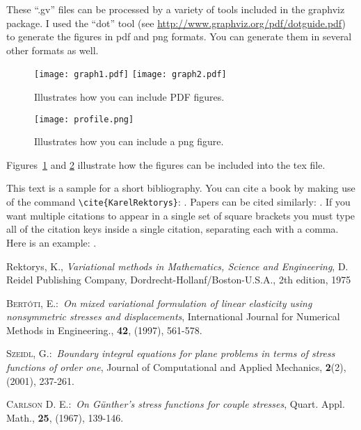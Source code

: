 \documentclass[11pt,a4paper]{amsart}
\theoremstyle{plain}
\numberwithin{equation}{section}
\theoremstyle{definition}
\begin{document}
These ``.gv'' files can be processed by a variety of tools included in the graphviz package. I used the ``dot'' tool (see \url{http://www.graphviz.org/pdf/dotguide.pdf}) to generate the figures in pdf and png formats. You can generate them in several other formats as well.

\begin{figure}[h] \label{fig:pdf}
	\texttt{[image: graph1.pdf]} \hspace{0.5in}
	\texttt{[image: graph2.pdf]}
	\caption{Illustrates how you can include PDF figures.}
	
\end{figure}


\begin{figure}[h] \label{fig:png}
	\texttt{[image: profile.png]} \hspace{0.5in}
	\caption{Illustrates how you can include a png figure.}
	
\end{figure}

Figures~\ref{fig:pdf} and \ref{fig:png} illustrate how the figures can be included into the tex file. 

This text is a sample for a short bibliography. You can cite a book by making use of
the command \verb"\cite{KarelRektorys}": \cite{KarelRektorys}. Papers can be cited
similarly: \cite{Bertoti97}. If you want multiple citations to appear in a single set
of square brackets you must type all of the citation keys inside a single citation,
separating each with a comma. Here is an example: \cite{Bertoti97, Szeidl2001,
Carlson67}.

\newpage

\begin{thebibliography}{9}                                                                                                %
Rektorys, K., \textit{Variational methods in Mathematics,
Science and Engineering}, D. Reidel Publishing Company,
Dordrecht-Hollanf/Boston-U.S.A., 2th edition, 1975

 \textsc{Bert\'{o}ti, E.}:\ \textit{On mixed variational formulation
of linear elasticity using nonsymmetric stresses and displacements}, International
Journal for Numerical Methods in Engineering., \textbf{42}, (1997), 561-578.

 \textsc{Szeidl, G.}:\ \textit{Boundary integral equations for
plane problems in terms of stress functions of order one}, Journal of Computational and
Applied Mechanics, \textbf{2}(2), (2001), 237-261.

  \textsc{Carlson D. E.}:\ \textit{On G\"{u}nther's stress functions
for couple stresses}, Quart. Appl. Math., \textbf{25}, (1967), 139-146.
\end{thebibliography}
\end{document}
